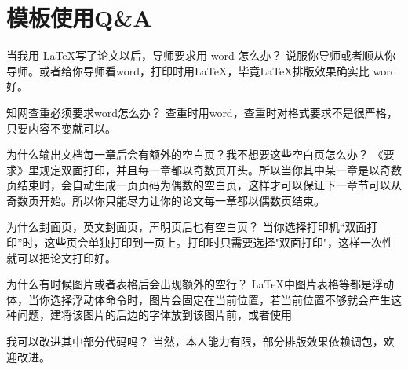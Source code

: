 \linespread{1.55}\selectfont
\chapter{模板使用Q\&A}
\begin{mybox}{当我用 \LaTeX 写了论文以后，导师要求用 word 怎么办？}
说服你导师或者顺从你导师。或者给你导师看word，打印时用\LaTeX，毕竟\LaTeX 排版效果确实比 word 好。
\end{mybox}
\begin{mybox}{知网查重必须要求word怎么办？}
查重时用word，查重时对格式要求不是很严格，只要内容不变就可以。
\end{mybox}

\begin{mybox}{为什么输出文档每一章后会有额外的空白页？我不想要这些空白页怎么办？}
《要求》里规定双面打印，并且{\color{red}每一章都以奇数页开头}。所以当你其中某一章是以奇数页结束时，会自动生成一页页码为偶数的空白页，这样才可以保证下一章节可以从奇数页开始。所以你只能尽力让你的论文每一章都以偶数页结束。
\end{mybox}

\begin{mybox}{为什么封面页，英文封面页，声明页后也有空白页？}
当你选择打印机“双面打印”时，这些页会单独打印到一页上。打印时只需要选择"双面打印"，这样一次性就可以把论文打印好。
\end{mybox}

\begin{mybox}{为什么有时候图片或者表格后会出现额外的空行？}
\LaTeX 中图片表格等都是浮动体，当你选择浮动体\myverb{[H]}命令时，图片会固定在当前位置，若当前位置不够就会产生这种问题，建将该图片的后边的字体放到该图片前，或者使用\myverb{[htp]}
\end{mybox}

\begin{mybox}{我可以改进其中部分代码吗？}
当然，本人能力有限，部分排版效果依赖调包，欢迎改进。
\end{mybox}